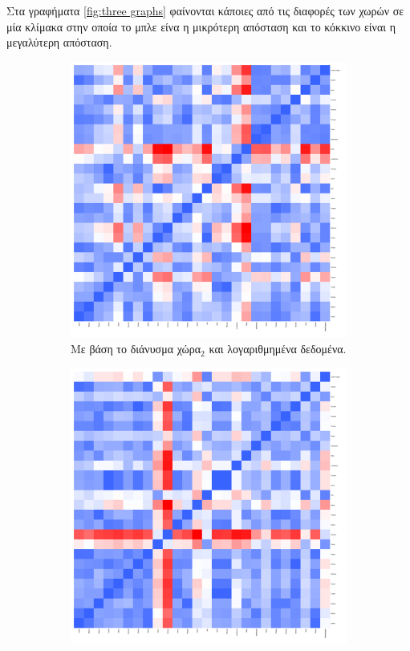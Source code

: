 \documentclass[a4paper,twoside,10pt]{article}
\begin{document}
	Στα γραφήματα \ref{fig:three graphs} φαίνονται κάποιες από τις διαφορές των χωρών σε μία κλίμακα στην οποία το μπλε είνα η μικρότερη απόσταση και το κόκκινο είναι η μεγαλύτερη απόσταση. 
	\begin{figure}[H]
		\centering

		\hfill
		\begin{subfigure}[b]{0.3\textwidth}
			\centering
			\includegraphics[width=\textwidth]{images/heatmap_distances_of_2015with_full_data_and_log=TRUE.png}
			\caption{Με βάση το διάνυσμα χώρα$_2$ και λογαριθμημένα δεδομένα.}
			\label{fig:three sin x}
		\end{subfigure}
		\hfill
		\begin{subfigure}[b]{0.3\textwidth}
			\centering
			\includegraphics[width=\textwidth]{images/heatmap_distances_of_2015.png}

\end{subfigure}
\end{figure}
\end{document}
